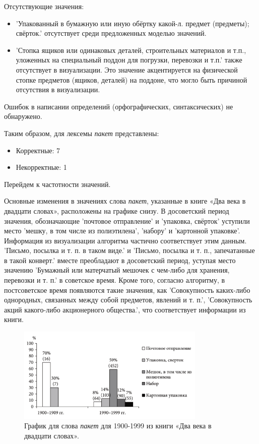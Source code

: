 Отсутствующие значения:
\begin{itemize}
    \item ’Упакованный в бумажную или иную обёртку какой-л. предмет (предметы); свёрток.’
отсутствует среди предложенных моделью значений.

    \item ’Стопка ящиков или одинаковых деталей, строительных материалов и т.п.,
уложенных на специальный поддон для погрузки, перевозки и т.п.’
также отсутствует в визуализации.
Это значение акцентируется на физической стопке предметов (ящиков, деталей) на поддоне,
что могло быть причиной отсутствия в визуализации.
\end{itemize}

Ошибок в написании определений (орфографических, синтаксических) не обнаружено.

Таким образом, для лексемы \textit{пакет} представлены:

\begin{itemize}
    \item Корректные: 7
    \item Некорректные: 1
\end{itemize}

Перейдем к частотности значений.

Основные изменения в значениях слова \textit{пакет}, указанные в книге «Два века в двадцати словах»,
расположены на графике снизу.
В досоветский период значения, обозначающие ’почтовое отправление’ и ’упаковка, свёрток’
уступили место ’мешку, в том числе из полиэтилена’, ’набору’ и ’картонной упаковке’.
Информация из визуализации алгоритма частично соответствует этим данным.
’Письмо, посылка и т. п. в таком виде.’ и ’Письмо, посылка и т. п., запечатанные в такой конверт.’
вместе преобладают в досоветский период, уступая место значению
’Бумажный или матерчатый мешочек с чем-либо для хранения, перевозки и т. п.’ в советское время.
Кроме того, согласно алгоритму, в постсоветское время появляются такие значения, как
’Совокупность каких-либо однородных, связанных между собой предметов, явлений и т. п.’,
’Совокупность акций какого-либо акционерного общества.’,
что соответствует информации из книги.

\begin{figure}[H]
    \centering %
    \includegraphics[width=0.8\textwidth]{img/book/paket/1900-1999}
    \caption{График для слова \textit{пакет} для 1900-1999 из книги «Два века в двадцати словах».}
\end{figure}

